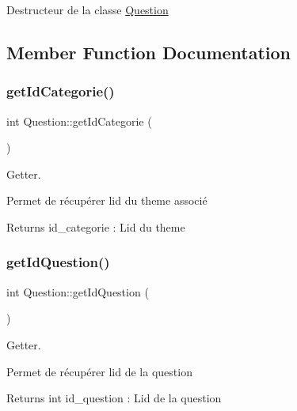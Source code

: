 Destructeur de la classe \mbox{\hyperlink{classQuestion}{Question}} 

\subsection{Member Function Documentation}
\mbox{\label{classQuestion_a1838d7b5fe4055ae28671fe49824008a}} 
\subsubsection{\texorpdfstring{get\+Id\+Categorie()}{getIdCategorie()}}
{\footnotesize\ttfamily int Question\+::get\+Id\+Categorie (\begin{DoxyParamCaption}{ }\end{DoxyParamCaption})}



Getter. 

Permet de récupérer l\textquotesingle{}id du theme associé \begin{DoxyReturn}{Returns}
id\+\_\+categorie \+: L\textquotesingle{}id du theme 
\end{DoxyReturn}
\mbox{\label{classQuestion_afeffea1a16f2da6bc8d17414596a5d4e}} 
\subsubsection{\texorpdfstring{get\+Id\+Question()}{getIdQuestion()}}
{\footnotesize\ttfamily int Question\+::get\+Id\+Question (\begin{DoxyParamCaption}{ }\end{DoxyParamCaption})}



Getter. 

Permet de récupérer l\textquotesingle{}id de la question \begin{DoxyReturn}{Returns}
int id\+\_\+question \+: L\textquotesingle{}id de la question 
\end{DoxyReturn}
\mbox{\label{classQuestion_a6c5bb67ddc2f5571f710d92764c8dfd7}} 
